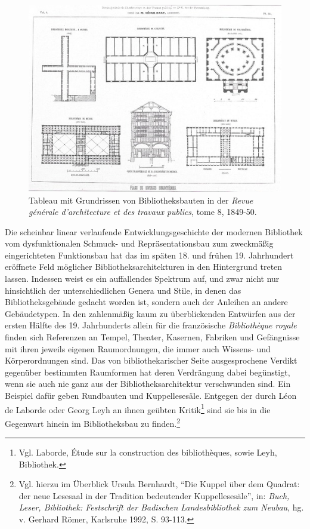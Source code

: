 \begin{figure}[htbp]
\centering
\includegraphics{img/wagner-3.jpg}
\caption{Tableau mit Grundrissen von Bibliotheksbauten in der
\emph{Revue générale d'architecture et des travaux publics}, tome 8,
1849-50.}
\end{figure}

Die scheinbar linear verlaufende Entwicklungsgeschichte der modernen
Bibliothek vom dysfunktionalen Schmuck- und Repräsentationsbau zum
zweckmäßig eingerichteten Funktionsbau hat das im späten 18. und frühen
19. Jahrhundert eröffnete Feld möglicher Bibliotheksarchitekturen in den
Hintergrund treten lassen. Indessen weist es ein auffallendes Spektrum
auf, und zwar nicht nur hinsichtlich der unterschiedlichen Genera und
Stile, in denen das Bibliotheksgebäude gedacht worden ist, sondern auch
der Anleihen an andere Gebäudetypen. In den zahlenmäßig kaum zu
überblickenden Entwürfen aus der ersten Hälfte des 19. Jahrhunderts
allein für die französische \emph{Bibliothèque royale} finden sich
Referenzen an Tempel, Theater, Kasernen, Fabriken und Gefängnisse mit
ihren jeweils eigenen Raumordnungen, die immer auch Wissens- und
Körperordnungen sind. Das von bibliothekarischer Seite ausgesprochene
Verdikt gegenüber bestimmten Raumformen hat deren Verdrängung dabei
begünstigt, wenn sie auch nie ganz aus der Bibliotheksarchitektur
verschwunden sind. Ein Beispiel dafür geben Rundbauten und
Kuppellesesäle. Entgegen der durch Léon de Laborde oder Georg Leyh an
ihnen geübten Kritik\footnote{Vgl. Laborde, Étude sur la construction
  des bibliothèques, sowie Leyh, Bibliothek.} sind sie bis in die
Gegenwart hinein im Bibliotheksbau zu finden.\footnote{Vgl. hierzu im
  Überblick Ursula Bernhardt, \enquote{Die Kuppel über dem Quadrat: der
  neue Lesesaal in der Tradition bedeutender Kuppellesesäle}, in:
  \emph{Buch, Leser, Bibliothek: Festschrift der Badischen
  Landesbibliothek zum Neubau}, hg. v. Gerhard Römer, Karlsruhe 1992, S.
  93-113.}

